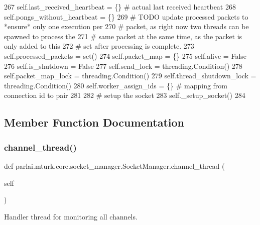 \begin{DoxyCode}
267         self.last\_received\_heartbeat = \{\}  \textcolor{comment}{# actual last received heartbeat}
268         self.pongs\_without\_heartbeat = \{\}
269         \textcolor{comment}{# TODO update processed packets to *ensure* only one execution per}
270         \textcolor{comment}{# packet, as right now two threads can be spawned to process the}
271         \textcolor{comment}{# same packet at the same time, as the packet is only added to this}
272         \textcolor{comment}{# set after processing is complete.}
273         self.processed\_packets = set()
274         self.packet\_map = \{\}
275         self.alive = \textcolor{keyword}{False}
276         self.is\_shutdown = \textcolor{keyword}{False}
277         self.send\_lock = threading.Condition()
278         self.packet\_map\_lock = threading.Condition()
279         self.thread\_shutdown\_lock = threading.Condition()
280         self.worker\_assign\_ids = \{\}  \textcolor{comment}{# mapping from connection id to pair}
281 
282         \textcolor{comment}{# setup the socket}
283         self.\_setup\_socket()
284 
\end{DoxyCode}


\subsection{Member Function Documentation}
\mbox{\label{classparlai_1_1mturk_1_1core_1_1socket__manager_1_1SocketManager_a1518f69049fee8c6afb27120cdd6b1f3}} 
\subsubsection{\texorpdfstring{channel\+\_\+thread()}{channel\_thread()}}
{\footnotesize\ttfamily def parlai.\+mturk.\+core.\+socket\+\_\+manager.\+Socket\+Manager.\+channel\+\_\+thread (\begin{DoxyParamCaption}\item[{}]{self }\end{DoxyParamCaption})}

\begin{DoxyVerb}Handler thread for monitoring all channels.
\end{DoxyVerb}
 

